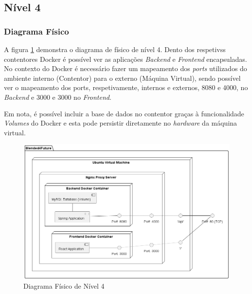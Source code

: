 \subsection{Nível 4}

\subsubsection{Diagrama Físico} 

A figura \ref{fig:diagram-lvl4-physical} demonstra o diagrama de físico de nível 4. Dento dos respetivss contentores \gls{Docker} é possível ver as aplicações  \textit{Backend} e \textit{Frontend} encapsuladas. No contexto do \gls{Docker} é necessário fazer um mapeamento dos \textit{ports} utilizados do ambiente interno (Contentor) para o externo (Máquina Virtual), sendo possível ver o mapeamento dos ports, respetivamente, internos e externos, 8080 e 4000, no \textit{Backend} e 3000 e 3000 no \textit{Frontend}.

Em nota, é possível incluir a base de dados no contentor graças à funcionalidade \textit{Volumes} do Docker e esta pode persistir diretamente no \textit{hardware} da máquina virtual.

\begin{figure}[h!tbp]
    \centering
    \includegraphics[width=\linewidth]{capitulos/cap3-analisedoproblema/assets/arquiteturasistema/physical/physical_l4.png}
    \caption{Diagrama Físico de Nível 4}
    \label{fig:diagram-lvl4-physical}
\end{figure}